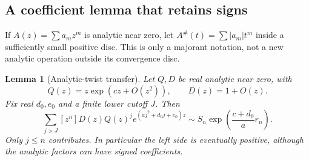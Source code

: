 \documentclass[11pt,a4paper]{article}
\numberwithin{equation}{section}
\newtheorem{lemma}[theorem]{Lemma}
\theoremstyle{definition}
\theoremstyle{remark}
\begin{document}
\subsection{A coefficient lemma that retains signs}

If $A(z)=\sum a_mz^m$ is analytic near zero, let
$A^{\#}(t)=\sum |a_m|t^m$ inside a sufficiently small positive disc.
This is only a majorant notation, not a new analytic operation outside its
convergence disc.

\begin{lemma}[Analytic-twist transfer]
\label{lem:twist}
Let $Q,D$ be real analytic near zero, with
\[
 Q(z)=z\exp(cz+O(z^2)),\qquad D(z)=1+O(z).
\]
Fix real $d_0,e_0$ and a finite lower cutoff $J$. Then
\begin{equation}
 \sum_{j>J}[z^n]D(z)Q(z)^j e^{(a j^2+d_0j+e_0)z}
 \sim S_n\exp\!\left(\frac{c+d_0}{a}r_n\right).
 \label{eq:twist}
\end{equation}
Only $j\le n$ contributes. In particular the left side is eventually
positive, although the analytic factors can have signed coefficients.
\end{lemma}
\end{document}
